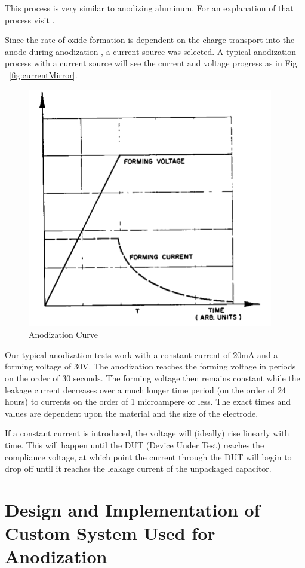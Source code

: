 \documentclass[journal]{IEEEtran}
\begin{document}
This process is very similar to anodizing aluminum. For an explanation of that process visit \cite{cwruEncAlanod}.

Since the rate of oxide formation is dependent on the charge transport into the anode during anodization \cite{tiMinit}, a current source was selected. A typical anodization process with a current source will see the current and voltage progress as in Fig. ~\ref{fig:currentMirror}.
 

\begin{figure}[here]
\centering
\includegraphics{anodCurve}
\caption{Anodization Curve \cite{tiMinit}}
\label{fig:anodCurve}
\end{figure}

Our typical anodization tests work with a constant current of 20mA and a forming voltage of 30V. The anodization reaches the forming voltage in periods on the order of 30 seconds. The forming voltage then remains constant while the leakage current decreases over  a much longer time period (on the order of 24 hours) to currents on the order of 1 microampere or less. The exact times and values are dependent upon the material and the size of the electrode.

If a constant current is introduced, the voltage will (ideally) rise linearly with time. This will happen until the DUT (Device Under Test) reaches the compliance voltage, at which point the current through the DUT will begin to drop off until it reaches the leakage current of the unpackaged capacitor. 

\section{Design and Implementation of Custom System Used for Anodization}
\end{document}
